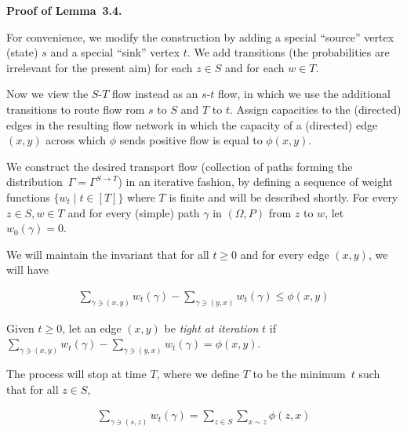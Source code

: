 \documentclass[10pt,a4paper]{article}
\begin{document}
\par\medskip\noindent\textbf{Proof of Lemma 3.4.}\par



For convenience, we modify the construction by adding a special “source” vertex (state) $s$ and a special “sink” vertex $t$. We add transitions (the probabilities are irrelevant for the present aim) for each $z\in S$ and for each $w\in T$.\par




Now we view the $S$-$T$ flow instead as an $s$-$t$ flow, in which we use the additional transitions to route flow rom $s$ to $S$ and $T$ to $t$. Assign capacities to the (directed) edges in the resulting flow network in which the capacity of a (directed) edge $(x,y)$ across which $\phi$ sends positive flow is equal to $\phi(x,y)$.\par




We construct the desired transport flow (collection of paths forming the distribution $\Gamma=\Gamma^{S\rightarrow T}$) in an iterative fashion, by defining a sequence of weight functions $\{w_{t}\mid t\in[T]\}$ where $T$ is finite and will be described shortly. For every $z\in S,w\in T$ and for every (simple) path $\gamma$ in $(\Omega,P)$ from $z$ to $w$, let $w_{0}(\gamma)=0$.\par




We will maintain the invariant that for all $t\geq 0$ and for every edge $(x,y)$, we will have\par


\[\begin{gathered}
\sum_{\gamma\ni(x,y)}w_{t}(\gamma)-\sum_{\gamma\ni(y,x)}w_{t}(\gamma)\leq\phi(x,y)
\end{gathered}\]




Given $t\geq 0$, let an edge $(x,y)$ be \emph{tight at iteration} $t$ if $\sum_{\gamma\ni(x,y)}w_{t}(\gamma)-\sum_{\gamma\ni(y,x)}w_{t}(\gamma)=\phi(x,y)$.\par




The process will stop at time $T$, where we define $T$ to be the minimum $t$ such that
for all $z\in S$,\par


\[\begin{gathered}
\sum_{\gamma\ni(s,z)}w_{t}(\gamma)=\sum_{z\in S}\sum_{x\sim z}\phi(z,x)
\end{gathered}\]
\end{document}
